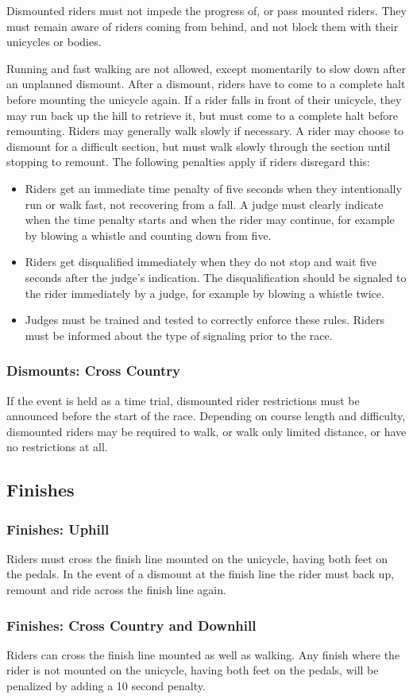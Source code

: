 Dismounted riders must not impede the progress of, or pass mounted riders.
They must remain aware of riders coming from behind, and not block them with their
unicycles or bodies.

Running and fast walking are not allowed, except momentarily to slow down after an unplanned dismount.
After a dismount, riders have to come to a complete halt before mounting the unicycle again.
If a rider falls in front of their unicycle, they may run back up the hill to retrieve it, but must come to a complete halt before remounting.
Riders may generally walk slowly if necessary.
A rider may choose to dismount for a difficult section, but must walk slowly through the section until stopping to remount.
The following penalties apply if riders disregard this:
\begin{itemize}
\item Riders get an immediate time penalty of five seconds when they intentionally run or walk fast, not recovering from a fall.
A judge must clearly indicate when the time penalty starts and when the rider may continue, for example by blowing a whistle and counting down from five.
\item Riders get disqualified immediately when they do not stop and wait five seconds after the judge's indication.
The disqualification should be signaled to the rider immediately by a judge, for example by blowing a whistle twice.
\item Judges must be trained and tested to correctly enforce these rules.
Riders must be informed about the type of signaling prior to the race.
\end{itemize}

\subsubsection{Dismounts: Cross Country}

If the event is held as a time trial, dismounted rider restrictions must be announced before the start of the race.
Depending on course length and difficulty, dismounted riders may be required to walk, or walk only limited distance, or have no restrictions at all.

\subsection{Finishes}

\subsubsection{Finishes: Uphill}
Riders must cross the finish line mounted on the unicycle, having both feet on the pedals.
In the event of a dismount at the finish line the rider must back up, remount and ride across the finish line again.
\subsubsection{Finishes: Cross Country and Downhill}
Riders can cross the finish line mounted as well as walking. %
Any finish where the rider is not mounted on the unicycle, having both feet on the pedals, will be penalized by adding a 10 second penalty.
